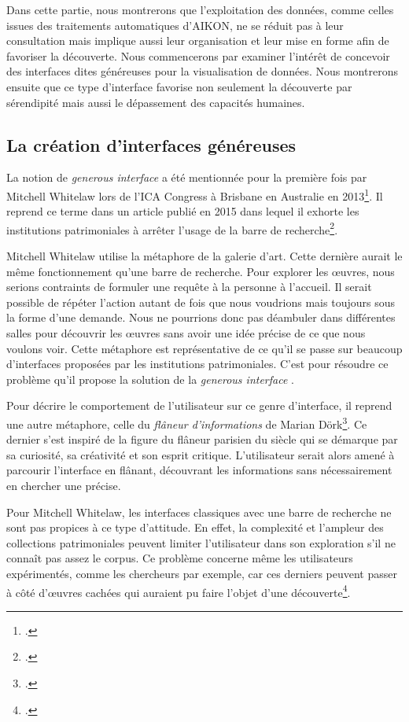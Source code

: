 Dans cette partie, nous montrerons que l'exploitation des données, comme celles issues des traitements automatiques d'AIKON, ne se réduit pas à leur consultation mais implique aussi leur organisation et leur mise en forme afin de favoriser la découverte. Nous commencerons par examiner l'intérêt de concevoir des interfaces dites \og généreuses \fg pour la visualisation de données. Nous montrerons ensuite que ce type d'interface favorise non seulement la découverte par sérendipité mais aussi le dépassement des capacités humaines.


\subsection{La création d'interfaces généreuses}


La notion de \og \textit{generous interface} \fg a été mentionnée pour la première fois par Mitchell Whitelaw lors de l'ICA Congress à Brisbane en Australie en 2013\footcite{whitelawGenerousInterfacesArchival2013}. Il reprend ce terme dans un article publié en 2015 dans lequel il exhorte les institutions patrimoniales à arrêter l'usage de la barre de recherche\footcite{whitelawGenerousInterfacesDigital2015}. 

Mitchell Whitelaw utilise la métaphore de la galerie d'art. Cette dernière aurait le même fonctionnement qu'une barre de recherche. Pour explorer les œuvres, nous serions contraints de formuler une requête à la personne à l'accueil. Il serait possible de répéter l'action autant de fois que nous voudrions mais toujours sous la forme d'une demande. Nous ne pourrions donc pas déambuler dans différentes salles pour découvrir les œuvres sans avoir une idée précise de ce que nous voulons voir. Cette métaphore est représentative de ce qu'il se passe sur beaucoup d'interfaces proposées par les institutions patrimoniales. C'est pour résoudre ce problème qu'il propose la solution de la \og \textit{generous interface} \fg.

Pour décrire le comportement de l'utilisateur sur ce genre d'interface, il reprend une autre métaphore, celle du \og \textit{flâneur d'informations} \fg de Marian Dörk\footcite{dorkInformationFlaneurFresh2011}. Ce dernier s'est inspiré de la figure du flâneur parisien du \XIX siècle qui se démarque par sa curiosité, sa créativité et son esprit critique. L'utilisateur serait alors amené à parcourir l'interface en flânant, découvrant les informations sans nécessairement en chercher une précise.

Pour Mitchell Whitelaw, les interfaces classiques avec une barre de recherche ne sont pas propices à ce type d'attitude. En effet, la complexité et l'ampleur des collections patrimoniales peuvent limiter l'utilisateur dans son exploration s'il ne connaît pas assez le corpus. Ce problème concerne même les utilisateurs expérimentés, comme les chercheurs par exemple, car ces derniers peuvent passer à côté d'œuvres cachées qui auraient pu faire l'objet d'une découverte\footcite{whitelawGenerousInterfacesDigital2015}. 

